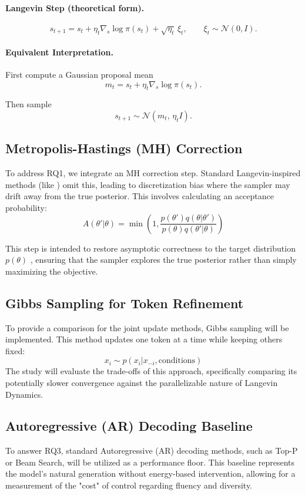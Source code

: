 \documentclass[11pt]{article}
\begin{document}
\paragraph{Langevin Step (theoretical form).}
\[
s_{t+1}
=
s_t
+
\eta_t \nabla_s \log \pi(s_t)
+
\sqrt{\eta_t}\,\xi_t,
\qquad
\xi_t \sim \mathcal{N}(0, I).
\]

\paragraph{Equivalent Interpretation.}
First compute a Gaussian proposal mean
\[
m_t
=
s_t
+
\eta_t \nabla_s \log \pi(s_t).
\]

Then sample
\[
s_{t+1}
\sim
\mathcal{N}\!\left(
m_t,\,
\eta_t I
\right).
\]


\subsection{Metropolis-Hastings (MH) Correction}
To address RQ1, we integrate an MH correction step. Standard Langevin-inspired methods (like \cite{10.5555/3600270.3600963}) omit this, leading to discretization bias where the sampler may drift away from the true posterior. This involves calculating an acceptance probability:
$$A(\theta'|\theta) = \min\left(1, \frac{p(\theta')q(\theta|\theta')}{p(\theta)q(\theta'|\theta)}\right)$$


This step is intended to restore asymptotic correctness to the target distribution 
$p(\theta)$
, ensuring that the sampler explores the true posterior rather than simply maximizing the objective.

\subsection{Gibbs Sampling for Token Refinement}
To provide a comparison for the joint update methods, Gibbs sampling will be implemented. This method updates one token at a time while keeping others fixed:
$$x_i \sim p(x_i | x_{-i}, \text{conditions})$$
The study will evaluate the trade-offs of this approach, specifically comparing its potentially slower convergence against the parallelizable nature of Langevin Dynamics.

\subsection{Autoregressive (AR) Decoding Baseline}
To answer RQ3, standard Autoregressive (AR) decoding methods, such as Top-P or Beam Search, will be utilized as a performance floor. This baseline represents the model's natural generation without energy-based intervention, allowing for a measurement of the "cost" of control regarding fluency and diversity.
\end{document}
